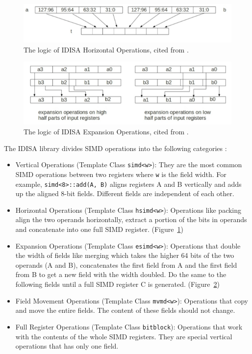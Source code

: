 \begin{figure}[ht!]
\centering
\includegraphics[width=130mm]{draw/horizontal.png}
\caption[Horizontal Operations in IDISA]{The logic of IDISA Horizontal Operations, cited from \cite{hua_idisa}.}
\label{figure:horizontal}
\end{figure}

\begin{figure}[ht!]
\centering
\includegraphics[width=130mm]{draw/expansion.png}
\caption[Expansion Operations in IDISA]{The logic of IDISA Expansion Operations, cited from \cite{hua_idisa}.}
\label{figure:expansion}
\end{figure}

The IDISA library divides SIMD operations into the following categories \cite{idisa_webpage}:
\begin{itemize}
    \item Vertical Operations (Template Class {\tt simd<w>}): They are the most common SIMD operations between two registers where {\tt w} is the field width. For example, {\tt simd<8>::add(A, B)} aligns registers A and B vertically and adds up the aligned 8-bit fields. Different fields are independent of each other.
    \item Horizontal Operations (Template Class {\tt hsimd<w>}): Operations like packing align the two operands horizontally, extract a portion of the bits in operands and concatenate into one full SIMD register. (Figure~\ref{figure:horizontal})
    \item Expansion Operations (Template Class {\tt esimd<w>}): Operations that double the width of fields like merging which takes the higher 64 bits of the two operands (A and B), concatenates the first field from A and the first field from B to get a new field with the width doubled. Do the same to the following fields until a full SIMD register C is generated. (Figure~\ref{figure:expansion})
    \item Field Movement Operations (Template Class {\tt mvmd<w>}): Operations that copy and move the entire fields. The content of these fields should not change.
    \item Full Register Operations (Template Class {\tt bitblock}): Operations that work with the contents of the whole SIMD registers. They are special vertical operations that has only one field.
\end{itemize}


